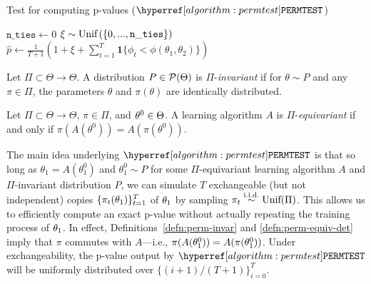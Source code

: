 \begin{algorithm}[h]\label{algorithm:permtest}
    \DontPrintSemicolon
    \caption{Test for computing p-values ($\permtest$)} \label{alg:permtest}
    \KwOut{p-value $\hat{p} \in (0,1]$}
    $\mathtt{n\_ties} \gets 0$\;
    $\xi \sim \textup{Unif}\left(\{0,...,\mathtt{n\_ties}\}\right)$ 
    $\hat{p} \gets \frac{1}{T+1}(1 + \xi + \sum_{t=1}^T \textbf{1} \{ \phi_t < \phi(\theta_1, \theta_2) \})$\;
\end{algorithm}

\begin{definition}[$\Pi$-invariance]\label{defn:perm-invar} 
    Let $\Pi \subset \Theta \to \Theta$. A distribution $P \in \mathcal{P}(\Theta)$
    is $\Pi$-\textit{invariant} if for $\theta \sim P$ and any $\pi \in \Pi$, the parameters $\theta$ and $\pi(\theta)$ are identically distributed.
\end{definition}

\begin{definition}[$\Pi$-equivariance]\label{defn:perm-equiv-det}
    Let $\Pi \subset \Theta \to \Theta$, $\pi \in \Pi$, and $\theta^0 \in \Theta$.
    A learning algorithm $A$ is $\Pi$-\textit{equivariant} if and only if $\pi(A(\theta^0)) = A(\pi(\theta^0))$.
\end{definition}

The main idea underlying $\permtest$ is that so long as $\theta_1 = A(\theta_1^0)$ and $\theta_1^0 \sim P$
for some $\Pi$-equivariant learning algorithm $A$ and $\Pi$-invariant distribution $P$, we can simulate $T$
exchangeable (but not independent) copies $\{\pi_t(\theta_1)\}_{t=1}^T$ of $\theta_1$ by sampling $\pi_t \overset{\text{i.i.d.}}{\sim} \textup{Unif}(\Pi)$. 
This allows us to efficiently compute an exact p-value without actually repeating the training process of $\theta_1$.
In effect, Definitions~\ref{defn:perm-invar} and \ref{defn:perm-equiv-det} imply that $\pi$ commutes with $A$---i.e., $\pi(A(\theta_1^0)) = A(\pi(\theta_1^0))$.
Under exchangeability, the p-value output by $\permtest$ will be uniformly distributed over $\{(i+1)/(T+1)\}_{i=0}^T$.

